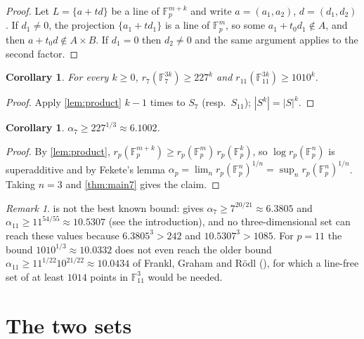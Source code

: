 \documentclass[11pt]{article}
\numberwithin{equation}{section}
\newtheorem{corollary}[theorem]{Corollary}
\theoremstyle{definition}
\theoremstyle{remark}
\newtheorem{remark}[theorem]{Remark}
\newcommand{\F}{\mathbb F}
\begin{document}
\begin{proof}
Let $L=\{a+td\}$ be a line of $\F_p^{m+k}$ and write $a=(a_1,a_2)$, $d=(d_1,d_2)$. If $d_1\neq0$,
the projection $\{a_1+td_1\}$ is a line of $\F_p^m$, so some $a_1+t_0d_1\notin A$, and then
$a+t_0d\notin A\times B$. If $d_1=0$ then $d_2\neq0$ and the same argument applies to the second
factor.
\end{proof}

\begin{corollary}\label{cor:power}
For every $k\ge0$, $r_7(\F_7^{3k})\ge227^k$ and $r_{11}(\F_{11}^{3k})\ge1010^k$.
\end{corollary}

\begin{proof}
Apply \cref{lem:product} $k-1$ times to $S_7$ (resp.\ $S_{11}$); $|S^k|=|S|^k$.
\end{proof}

\begin{corollary}\label{cor:alpha}
$\alpha_7\ge227^{1/3}\approx 6.1002$.
\end{corollary}

\begin{proof}
By \cref{lem:product}, $r_p(\F_p^{m+k})\ge r_p(\F_p^m)\,r_p(\F_p^k)$, so $\log r_p(\F_p^n)$ is
superadditive and by Fekete's lemma $\alpha_p=\lim_n r_p(\F_p^n)^{1/n}=\sup_n
r_p(\F_p^n)^{1/n}$. Taking $n=3$ and \cref{thm:main7} gives the claim.
\end{proof}

\begin{remark}
 is not the best known bound: \cite[Thm.~1.1]{FuhrerTaranchuk} gives
$\alpha_7\ge7^{20/21}\approx6.3805$ and $\alpha_{11}\ge11^{54/55}\approx10.5307$ (see the
introduction), and no three-dimensional set can reach these values because $6.3805^3>242$ and
$10.5307^3>1085$. For $p=11$ the bound $1010^{1/3}\approx10.0332$ does not even reach the older
bound $\alpha_{11}\ge 11^{1/22}10^{21/22}\approx10.0434$ of Frankl, Graham and R\"odl
(\cite[Table~1]{EFFKPSV}), for which a line-free set of at least $1014$ points in $\F_{11}^3$
would be needed.
\end{remark}

\section{The two sets}
\end{document}
